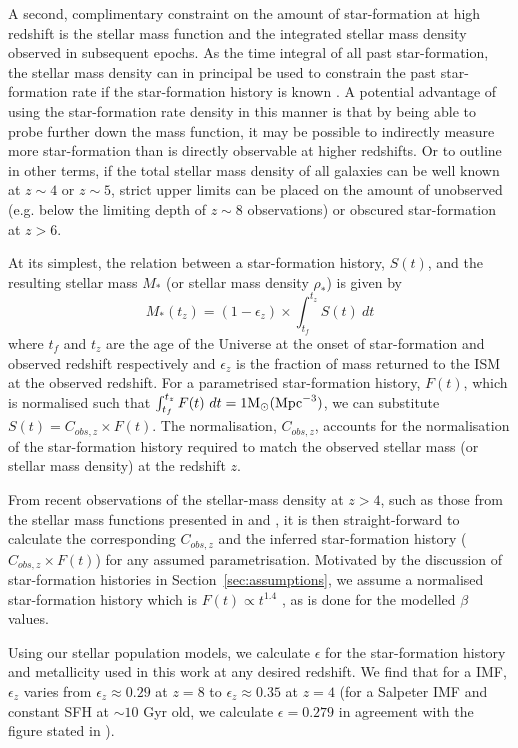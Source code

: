 A second, complimentary constraint on the amount of star-formation at high redshift is the stellar mass function and the integrated stellar mass density observed in subsequent epochs. As the time integral of all past star-formation, the stellar mass density can in principal be used to constrain the past star-formation rate if the star-formation history is known \citep{Stark:2007gi}.
A potential advantage of using the star-formation rate density in this manner is that by being able to probe further down the mass function, it may be possible to indirectly measure more star-formation than is directly observable at higher redshifts. Or to outline in other terms, if the total stellar mass density of all galaxies can be well known at $z\sim4$ or $z\sim5$, strict upper limits can be placed on the amount of unobserved (e.g. below the limiting depth of $z\sim8$ observations) or obscured star-formation at $z>6$.

At its simplest, the relation between a star-formation history, $S(t)$, and the resulting stellar mass  $M_{*}$ (or stellar mass density $\rho_{*}$) is given by
\begin{equation}
    M_{*}(t_{z}) = (1 - \epsilon_{z}) \times  \int_{t_{f}}^{t_{z}} S(t)~dt
\end{equation}
where $t_f$ and $t_z$ are the age of the Universe at the onset of star-formation and observed redshift respectively and $\epsilon_{z}$ is the fraction of mass returned to the ISM at the observed redshift. For a parametrised star-formation history, $F(t)$, which is normalised such that \( \int_{t_{f}}^{t_{z}} F(t)~dt = 1 \rm{M}_{\odot} (\rm{Mpc}^{-3}) \), we can substitute $S(t) = C_{obs,z}\times F(t)$. The normalisation, $C_{obs,z}$, accounts for the normalisation of the star-formation history required to match the observed stellar mass (or stellar mass density) at the redshift $z$. 

From recent observations of the stellar-mass density at $z > 4$, such as those from the stellar mass functions presented in \citet{Duncan:2014gh} and \citet{Grazian:2014vx}, it is then straight-forward to calculate the corresponding $C_{obs,z}$ and the inferred star-formation history ($C_{obs,z}\times F(t)$) for any assumed parametrisation. Motivated by the discussion of star-formation histories in Section~\ref{sec:assumptions}, we assume a normalised star-formation history which is $F(t) \propto t^{1.4}$ \citep{Salmon:2014tm}, as is done for the modelled $\beta$ values.

Using our stellar population models, we calculate $\epsilon$ for the star-formation history and metallicity used in this work at any desired redshift. We find that for a \citet{Chabrier:2003ki} IMF, $\epsilon_{z}$ varies from $\epsilon_{z} \approx 0.29$ at $z = 8$ to $\epsilon_{z} \approx 0.35$ at $z = 4$ (for a Salpeter IMF and constant SFH at $\sim 10$ Gyr old, we calculate $\epsilon = 0.279$ in agreement with the figure stated in \citet{Robertson:2013ji}).


